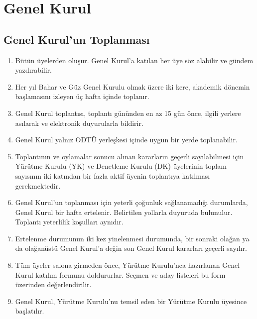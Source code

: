 \documentclass[11pt,a4paper]{article}
\begin{document}
\section{Genel Kurul}

\subsection{Genel Kurul'un Toplanması}
\begin{enumerate}
    \item Bütün üyelerden oluşur. Genel Kurul’a katılan her üye söz alabilir ve gündem yazdırabilir.
    \item Her yıl Bahar ve Güz Genel Kurulu olmak üzere iki kere, akademik dönemin başlamasını izleyen üç hafta içinde toplanır.
    \item Genel Kurul toplantısı, toplantı gününden en az 15 gün önce, ilgili yerlere asılarak ve elektronik duyurularla bildirir.
    \item Genel Kurul yalnız ODTÜ yerleşkesi içinde uygun bir yerde toplanabilir.
    \item Toplantının ve oylamalar sonucu alınan kararların geçerli sayılabilmesi için Yürütme Kurulu (YK) ve Denetleme Kurulu (DK) üyelerinin toplam sayısının iki katından bir fazla aktif üyenin toplantıya katılması gerekmektedir.
    \item Genel Kurul’un toplanması için yeterli çoğunluk sağlanamadığı durumlarda, Genel Kurul bir hafta ertelenir. Belirtilen yollarla duyuruda bulunulur. Toplantı yeterlilik koşulları aynıdır.
    \item Ertelenme durumunun iki kez yinelenmesi durumunda, bir sonraki olağan ya da olağanüstü Genel Kurul’a değin son Genel Kurul kararları geçerli sayılır.
    \item Tüm üyeler salona girmeden önce, Yürütme Kurulu’nca hazırlanan Genel Kurul katılım formunu doldururlar. Seçmen ve aday listeleri bu form üzerinden değerlendirilir.
    \item Genel Kurul, Yürütme Kurulu’nu temsil eden bir Yürütme Kurulu üyesince başlatılır.
\end{enumerate}
\end{document}
